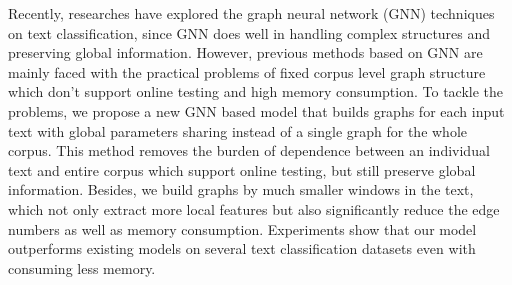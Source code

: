 Recently, researches have explored the graph neural network (GNN) techniques on text classification, since GNN does well in handling complex structures and preserving global information. However, previous methods based on GNN are mainly faced with the practical problems of fixed corpus level graph structure which don't support online testing and high memory consumption. To tackle the problems, we propose a new GNN based model that builds graphs for each input text with global parameters sharing instead of a single graph for the whole corpus. This method removes the burden of dependence between an individual text and entire corpus which support online testing, but still preserve global information. Besides, we build graphs by much smaller windows in the text, which not only extract more local features but also significantly reduce the edge numbers as well as memory consumption. Experiments show that our model outperforms existing models on several text classification datasets even with consuming less memory.